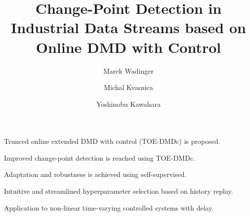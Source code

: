 \documentclass[preprint,12pt,authoryear]{elsarticle}
\begin{document}
\begin{frontmatter}


	\title{Change-Point Detection in Industrial Data Streams based on Online DMD with Control}

	\author[aff1,aff2]{Marek Wadinger}

	\author[aff1]{Michal Kvasnica}

	\author[aff2]{Yoshinobu Kawahara}



	\begin{abstract}
		
	\end{abstract}

	\begin{graphicalabstract}
	\end{graphicalabstract}

	\begin{highlights}
		\item Trunced online extended DMD with control (TOE-DMDc) is proposed.
		\item Improved change-point detection is reached using TOE-DMDc.
		\item Adaptation and robustness is achieved using self-supervised.
		\item Intuitive and streamlined hyperparameter selection based on history replay.
		\item Application to non-linear time-varying controlled systems with delay.
	\end{highlights}


	\begin{keyword}



	\end{keyword}

\end{frontmatter}
\end{document}
